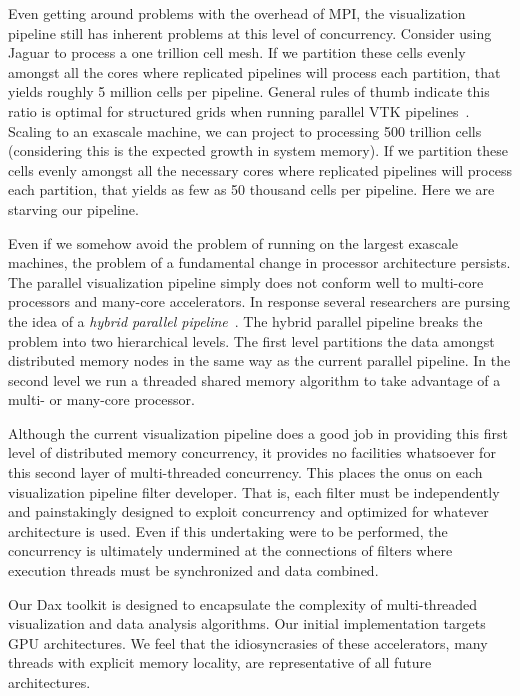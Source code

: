 \documentclass{vgtc}                          %
\newcommand*{\lcite}[1]{~\cite{#1}}
\newcommand*{\keyterm}[1]{\emph{#1}}
\begin{document}
Even getting around problems with the overhead of MPI, the visualization
pipeline still has inherent problems at this level of concurrency.
Consider using Jaguar to process a one trillion cell mesh.  If we partition
these cells evenly amongst all the cores where replicated pipelines will
process each partition, that yields roughly 5 million cells per pipeline.
General rules of thumb indicate this ratio is optimal for structured grids
when running parallel VTK pipelines\lcite{ParaViewTutorial}.  Scaling to an
exascale machine, we can project to processing 500 trillion cells
(considering this is the expected growth in system memory).  If we
partition these cells evenly amongst all the necessary cores where
replicated pipelines will process each partition, that yields as few as 50
thousand cells per pipeline.  Here we are starving our pipeline.

Even if we somehow avoid the problem of running on the largest exascale
machines, the problem of a fundamental change in processor architecture
persists.  The parallel visualization pipeline simply does not conform well
to multi-core processors and many-core accelerators.  In response several
researchers are pursing the idea of a \keyterm{hybrid parallel
  pipeline}\lcite{Camp10,Howison11,Li08}.  The hybrid parallel pipeline
breaks the problem into two hierarchical levels.  The first level
partitions the data amongst distributed memory nodes in the same way as the
current parallel pipeline.  In the second level we run a threaded shared
memory algorithm to take advantage of a multi- or many-core processor.

Although the current visualization pipeline does a good job in providing
this first level of distributed memory concurrency, it provides no
facilities whatsoever for this second layer of multi-threaded concurrency.
This places the onus on each visualization pipeline filter developer.  That
is, each filter must be independently and painstakingly designed to exploit
concurrency and optimized for whatever architecture is used.  Even if this
undertaking were to be performed, the concurrency is ultimately undermined
at the connections of filters where execution threads must be synchronized
and data combined.

Our Dax toolkit is designed to encapsulate the complexity of multi-threaded
visualization and data analysis algorithms.  Our initial implementation
targets GPU architectures.  We feel that the idiosyncrasies of these
accelerators, many threads with explicit memory locality, are
representative of all future architectures.
\end{document}
